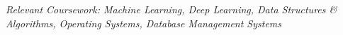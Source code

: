 \vspace{1.5pt}%
\noindent\textit{Relevant Coursework: Machine Learning, Deep Learning, Data Structures \& Algorithms, Operating Systems, Database Management Systems}\par